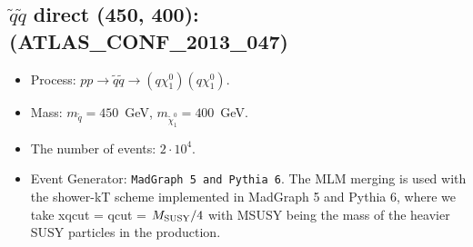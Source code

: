 \documentclass[12pt]{article}
\begin{document}
    
\subsection*{$\tilde q \tilde q$ direct (450, 400): (ATLAS\_CONF\_2013\_047)} 


        \begin{itemize}
        \item  Process: $pp \to \tilde q \tilde q \to (q \chi_1^0)(q \chi_1^0)$.
        \item  Mass: $m_{\tilde q} = 450$~GeV, $m_{\tilde \chi_1^0} = 400$~GeV.
        \item  The number of events: $2 \cdot 10^4$.
        \item  Event Generator: {\tt MadGraph 5 and Pythia 6}.
                The MLM merging is used with the shower-kT scheme implemented in MadGraph 5 and Pythia 6, where we take xqcut = qcut = $M_{\rm SUSY}/4$ with MSUSY being the mass of the heavier SUSY particles in the production.      
        \end{itemize}    
    
\end{document}
